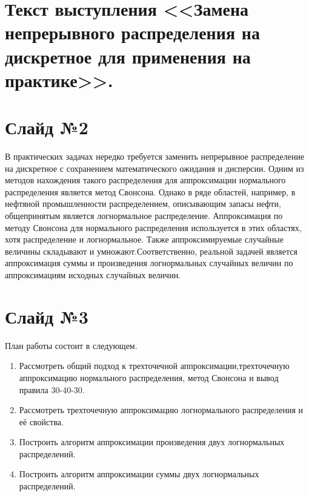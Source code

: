 \documentclass[specialist, substylefile = spbu.rtx,
subf,href,colorlinks=true, 12pt]{disser}
\begin{document}
	
	\pagebreak
	
	
	\pagebreak
	
	\section*{Текст выступления <<Замена непрерывного распределения на дискретное для применения на практике>>.}
	\section*{Слайд №2}
	
	В практических задачах нередко требуется заменить непрерывное распределение на
	дискретное с сохранением математического ожидания и дисперсии. Одним из методов
	нахождения такого распределения для аппроксимации нормального распределения является метод Свонсона. Однако в ряде областей, например, в нефтяной промышленности распределением, описывающим запасы нефти, общепринятым является логнормальное распределение. Аппроксимация по методу Свонсона для нормального распределения используется в этих областях, хотя распределение и логнормальное. Также аппроксимируемые случайные величины складывают и умножают.Соответственно, реальной задачей является аппроксимация суммы и произведения логнормальных случайных величин по аппроксимациям исходных случайных величин.

	\section*{Слайд №3}
	
	План работы состоит в следующем.
	\begin{enumerate}
		\item Рассмотреть общий подход к трехточечной аппроксимации,трехточечную аппроксимацию нормального распределения, метод Свонсона и вывод правила 30-40-30.
		\item Рассмотреть трехточечную аппроксимацию логнормального распределения и её свойства.
		\item Построить алгоритм аппроксимации произведения двух логнормальных распределений.
		\item Построить алгоритм аппроксимации суммы двух логнормальных распределений.
	\end{enumerate}
	
\end{document}
